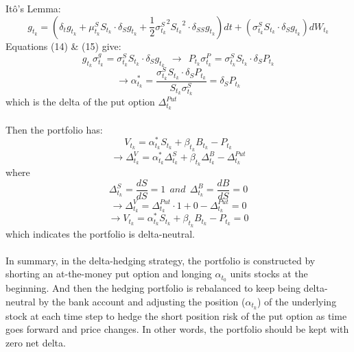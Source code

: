 \documentclass[12pt]{article}
\begin{document}
Itô's Lemma:
\begin{equation}
    {g_{t_k}} = ({\delta_t}{g_{t_k}} + {\mu^S_{t_k}} {S_{t_k}} \cdot {\delta_S}{g_{t_k}} + {\frac{1}{2}} {{\sigma^S_{t_k}}^2} {{S_{t_k}}^2}  \cdot  {\delta_{SS}}{g_{t_k}})dt 
    + ( {\sigma^S_{t_k}} {S_{t_k}} \cdot {{\delta}_{S}}{g_{t_k}} ){dW_{t_k}}
\end{equation}
Equations (14) \& (15) give:
\begin{equation}
    {g_{t_k}}{\sigma^g_{t_k}} = {\sigma^S_{t_k}} {S_{t_k}} \cdot {{\delta}_{S}}{g_{t_k}}
    ~~ \to ~~
    {P_{t_k}}{\sigma^P_{t_k}} = {\sigma^S_{t_k}} {S_{t_k}} \cdot {{\delta}_{S}}{P_{t_k}}
\end{equation}
\begin{equation}
    \to  {\alpha^*_{t_k}} = {\frac{ {\sigma^S_{t_k}} {S_{t_k}} \cdot {{\delta}_{S}}{P_{t_k}} }  
    { {S_{t_k}} {\sigma^S_{t_k}} } } = {{\delta}_{S}}{P_{t_k}}
\end{equation}
which is the delta of the put option ${\Delta^{Put}_{t_k}}$ \\
\\Then the portfolio has:
\begin{equation}
    {V_{t_k}} = {\alpha^*_{t_k}} {S_{t_k}} + {{\beta}_{t_k}} {B_{t_k}} - {P_{t_k}}
\end{equation}
\begin{equation}
    \longrightarrow {\Delta^{V}_{t_k}} = {\alpha^*_{t_k}} {\Delta^{S}_{t_k}} + {{\beta}_{t_k}}{\Delta^{B}_{t_k}} - {\Delta^{Put}_{t_k}}
\end{equation}
where
\begin{equation}
    {\Delta^{S}_{t_k}} = {\frac{dS}{dS}} = 1
    ~~ and ~~
    {\Delta^{B}_{t_k}} = {\frac{dB}{dS}} = 0
\end{equation}
\begin{equation}
    \longrightarrow {\Delta^{V}_{t_k}} = {\Delta^{Put}_{t_k}} \cdot 1 + 0 - {\Delta^{Put}_{t_k}} = 0
\end{equation}
\begin{equation}
    \longrightarrow {V_{t_k}} = {\alpha^*_{t_k}} {S_{t_k}} + {{\beta}_{t_k}} {B_{t_k}} - {P_{t_k}} = 0
\end{equation}
which indicates the portfolio is delta-neutral.\\
\\In summary, in the delta-hedging strategy, the portfolio is constructed by shorting an at-the-money put option and longing ${\alpha_{t_0}}$ units stocks at the beginning. And then the hedging portfolio is rebalanced to keep being delta-neutral by the bank account and adjusting the position (${\alpha_{t_k}}$) of the underlying stock at each time step to hedge the short position risk of the put option as time goes forward and price changes. In other words, the portfolio should be kept with zero net delta.\\
\end{document}
